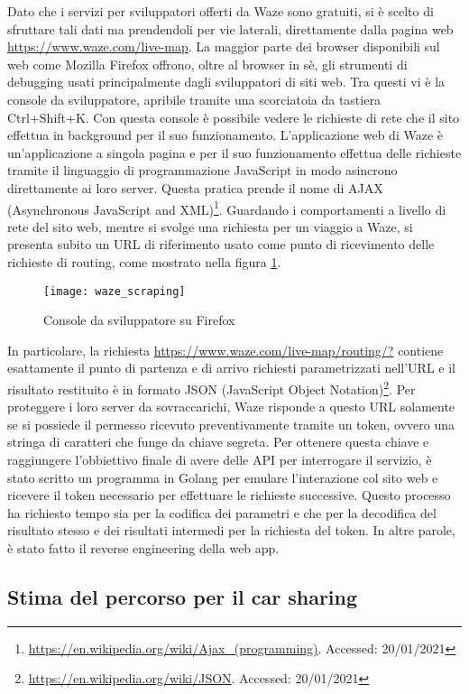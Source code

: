 Dato che i servizi per sviluppatori offerti da Waze sono gratuiti, si è scelto di sfruttare tali dati ma prendendoli per vie laterali, direttamente dalla pagina web \url{https://www.waze.com/live-map}. La maggior parte dei browser disponibili sul web come Mozilla Firefox offrono, oltre al browser in sè, gli strumenti di debugging usati principalmente dagli sviluppatori di siti web. Tra questi vi è la console da sviluppatore, apribile tramite una scorciatoia da tastiera Ctrl+Shift+K. Con questa console è possibile vedere le richieste di rete che il sito effettua in background per il suo funzionamento. L'applicazione web di Waze è un'applicazione a singola pagina e per il suo funzionamento effettua delle richieste tramite il linguaggio di programmazione JavaScript in modo asincrono direttamente ai loro server. Questa pratica prende il nome di AJAX (Asynchronous JavaScript and XML)\footnote{\url{https://en.wikipedia.org/wiki/Ajax_(programming)}. Accessed: 20/01/2021}. Guardando i comportamenti a livello di rete del sito web, mentre si svolge una richiesta per un viaggio a Waze, si presenta subito un URL di riferimento usato come punto di ricevimento delle richieste di routing, come mostrato nella figura \ref{image:1}.

\begin{figure}[H]
	\texttt{[image: waze\_scraping]}
	\caption{Console da sviluppatore su Firefox}
	\label{image:1}
\end{figure}

In particolare, la richiesta \url{https://www.waze.com/live-map/routing/?} contiene esattamente il punto di partenza e di arrivo richiesti parametrizzati nell'URL e il risultato restituito è in formato JSON (JavaScript Object Notation)\footnote{\url{https://en.wikipedia.org/wiki/JSON}. Accessed: 20/01/2021}. Per proteggere i loro server da sovraccarichi, Waze risponde a questo URL solamente se si possiede il permesso ricevuto preventivamente tramite un token, ovvero una stringa di caratteri che funge da chiave segreta. Per ottenere questa chiave e raggiungere l'obbiettivo finale di avere delle API per interrogare il servizio, è stato scritto un programma in Golang per emulare l'interazione col sito web e ricevere il token necessario per effettuare le richieste successive. Questo processo ha richiesto tempo sia per la codifica dei parametri e che per la decodifica del risultato stesso e dei risultati intermedi per la richiesta del token. In altre parole, è stato fatto il reverse engineering della web app.

\subsection{Stima del percorso per il car sharing}

